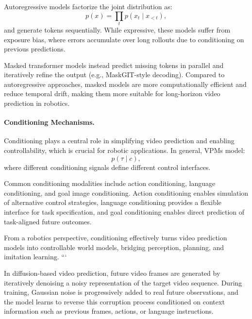 Autoregressive models factorize the joint distribution as:
\[
p(x) = \prod_t p(x_t \mid x_{<t}),
\]
and generate tokens sequentially. While expressive, these models suffer from exposure bias, where errors accumulate over long rollouts due to conditioning on previous predictions.

Masked transformer models instead predict missing tokens in parallel and iteratively refine the output (e.g., MaskGIT-style decoding). Compared to autoregressive approaches, masked models are more computationally efficient and reduce temporal drift, making them more suitable for long-horizon video prediction in robotics.

\paragraph{Conditioning Mechanisms.}
Conditioning plays a central role in simplifying video prediction and enabling controllability, which is crucial for robotic applications. In general, VPMs model:
\[
p(\tau \mid c),
\]
where different conditioning signals define different control interfaces.

Common conditioning modalities include action conditioning, language conditioning, and goal image conditioning. Action conditioning enables simulation of alternative control strategies, language conditioning provides a flexible interface for task specification, and goal conditioning enables direct prediction of task-aligned future outcomes. 

From a robotics perspective, conditioning effectively turns video prediction models into controllable world models, bridging perception, planning, and imitation learning.
```





















In diffusion-based video prediction, future video frames are generated by iteratively denoising a noisy representation of the target video sequence. During training, Gaussian noise is progressively added to real future observations, and the model learns to reverse this corruption process conditioned on context information such as previous frames, actions, or language instructions.

